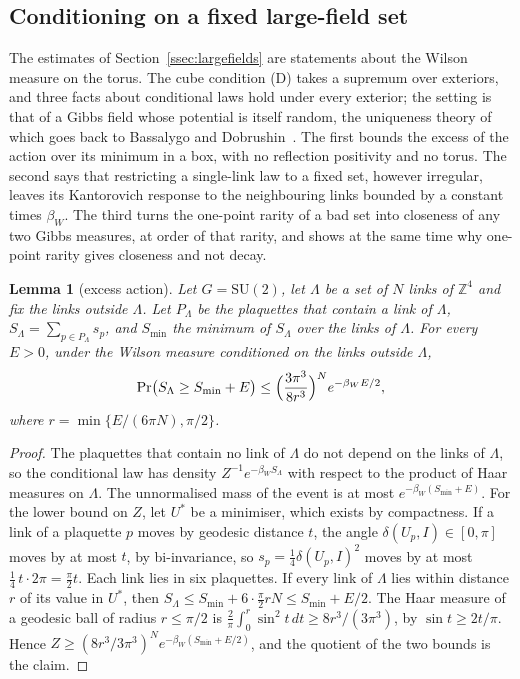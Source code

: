 \documentclass[11pt]{amsart}
\newtheorem{lemma}[theorem]{Lemma}
\theoremstyle{definition}
\theoremstyle{remark}
\numberwithin{equation}{section}
\newcommand{\Z}{\mathbb{Z}}
\newcommand{\SU}{\mathrm{SU}}
\begin{document}
\subsection{Conditioning on a fixed large-field set}\label{ssec:fixedset}

The estimates of Section~\ref{ssec:largefields} are statements about the
Wilson measure on the torus. The cube condition (D) takes a supremum over
exteriors, and three facts about conditional laws hold under every
exterior; the setting is that of a Gibbs field whose potential is itself
random, the uniqueness theory of which goes back to Bassalygo and
Dobrushin~\cite{BD86}. The first bounds the excess of the action over its minimum in a
box, with no reflection positivity and no torus. The second says that
restricting a single-link law to a fixed set, however irregular, leaves its
Kantorovich response to the neighbouring links bounded by a constant times
$\beta_W$. The third turns the one-point rarity of a bad set into closeness
of any two Gibbs measures, at order of that rarity, and shows at the same
time why one-point rarity gives closeness and not decay.

\begin{lemma}[excess action]\label{lem:excess}
Let $G=\SU(2)$, let $\Lambda$ be a set of $N$ links of $\Z^4$ and fix the
links outside $\Lambda$. Let $P_\Lambda$ be the plaquettes that contain a
link of $\Lambda$, $S_\Lambda=\sum_{p\in P_\Lambda}s_p$, and $S_{\min}$ the
minimum of $S_\Lambda$ over the links of $\Lambda$. For every $E>0$, under
the Wilson measure conditioned on the links outside $\Lambda$,
\[
\Pr\bigl(S_\Lambda\ge S_{\min}+E\bigr)\le\Bigl(\frac{3\pi^3}{8r^3}\Bigr)^N
e^{-\beta_WE/2},
\]
where $r=\min\{E/(6\pi N),\pi/2\}$.
\end{lemma}

\begin{proof}
The plaquettes that contain no link of $\Lambda$ do not depend on the
links of $\Lambda$, so the conditional law has density $Z^{-1}e^{-\beta_W
S_\Lambda}$ with respect to the product of Haar measures on $\Lambda$. The
unnormalised mass of the event is at most $e^{-\beta_W(S_{\min}+E)}$. For
the lower bound on $Z$, let $U^*$ be a minimiser, which exists by
compactness. If a link of a plaquette $p$ moves by geodesic distance $t$,
the angle $\delta(U_p,I)\in[0,\pi]$ moves by at most $t$, by bi-invariance,
so $s_p=\frac14\delta(U_p,I)^2$ moves by at most $\frac14\,t\cdot2\pi=
\frac\pi2t$. Each link lies in six plaquettes. If every link of $\Lambda$
lies within distance $r$ of its value in $U^*$, then $S_\Lambda\le S_{\min}
+6\cdot\frac\pi2rN\le S_{\min}+E/2$. The Haar measure of a geodesic ball of
radius $r\le\pi/2$ is $\frac2\pi\int_0^r\sin^2t\,dt\ge8r^3/(3\pi^3)$, by
$\sin t\ge2t/\pi$. Hence $Z\ge(8r^3/3\pi^3)^Ne^{-\beta_W(S_{\min}+E/2)}$,
and the quotient of the two bounds is the claim.
\end{proof}
\end{document}
